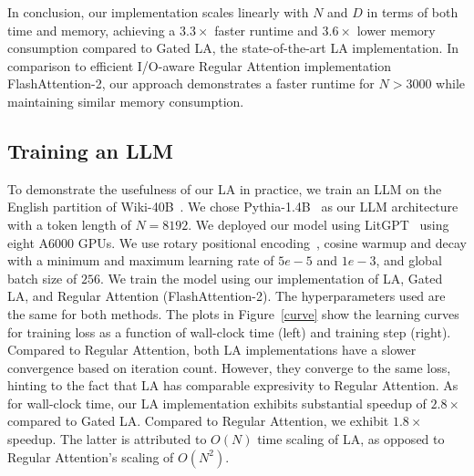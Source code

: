 \par In conclusion, our implementation scales linearly with $N$ and $D$ in terms of both time and memory, achieving a $3.3\times$ faster runtime and $3.6\times$ lower memory consumption compared to Gated LA, the state-of-the-art LA implementation. In comparison to efficient I/O-aware Regular Attention implementation FlashAttention-2, our approach demonstrates a faster runtime for $N>3000$ while maintaining similar memory consumption.




\subsection{Training an LLM}
\label{exp:llm}
To demonstrate the usefulness of our LA in practice, we train an LLM on the English partition of Wiki-40B~\cite{guo2020wiki}. We chose Pythia-1.4B~\cite{biderman2023pythia} as our LLM architecture with a token length of $N = 8192$. We deployed our model using LitGPT~\cite{litgpt-2023} using eight A6000 GPUs. We use rotary positional encoding~\cite{su2024roformer}, cosine warmup and decay with a minimum and maximum learning rate of $5e-5$ and $1e-3$, and global batch size of $256$. We train the model using our implementation of LA, Gated LA, and Regular Attention (FlashAttention-2). The hyperparameters used are the same for both methods. 
The plots in Figure~\ref{curve} show the learning curves for training loss as a function of wall-clock time (left) and training step (right). Compared to Regular Attention, both LA implementations have a slower convergence based on iteration count. However, they converge to the same loss, hinting to the fact that LA has comparable expresivity to Regular Attention. As for wall-clock time, our LA implementation exhibits substantial speedup of $2.8\times$ compared to Gated LA. Compared to Regular Attention, we exhibit $1.8\times$ speedup. The latter is attributed to $O(N)$ time scaling of LA, as opposed to Regular Attention's scaling of $O(N^2)$. 

